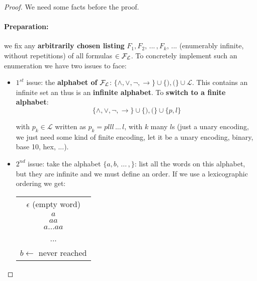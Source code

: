 	\begin{proof}
		We need some facts before the proof.\\

		\paragraph{Preparation:} we fix any \textbf{arbitrarily chosen listing} $F_1, F_2, \, ... \, , F_k , \, ...$ (enumerably infinite, without repetitions) of all formulas $\in \mathcal{F}_\mathcal{L}$. To concretely implement such an enumeration we have two issues to face:

		\begin{itemize}
			 \item $1^{st}$ issue: the \textbf{alphabet of} $\mathcal{F}_\mathcal{L}$: $\{\wedge, \vee, \neg, \rightarrow\} \cup \{),(\} \cup \mathcal{L}$. This contains an infinite set an thus is an \textbf{infinite alphabet}. To \textbf{switch to a finite alphabet}:
			$$ \{\wedge, \vee, \neg, \rightarrow\} \cup \{),(\} \cup \{p,l\} $$

			with $p_k \in \mathcal{L}$ written as $p_k = plll \, ... \, l$, with $k$ many $l$s (just a unary encoding, we just need some kind of finite encoding, let it be a unary encoding, binary, base 10, hex, ...).\\

			\newpage

			\item $2^{nd}$ issue: take the alphabet $\{a,b, \, ... \, , \}$: list all the words on this alphabet, but they are infinite and we must define an order. If we use a lexicographic ordering we get:

			\begin{center}
				\begin{tabular}{| c |}
					\hline
					$\epsilon$ (empty word)\\
					$a$\\
					$aa$\\
					$a...aa$\\
					...\\
					$b \leftarrow$ never reached\\
					\hline
				\end{tabular}
			\end{center}


\end{itemize}
\end{proof}
